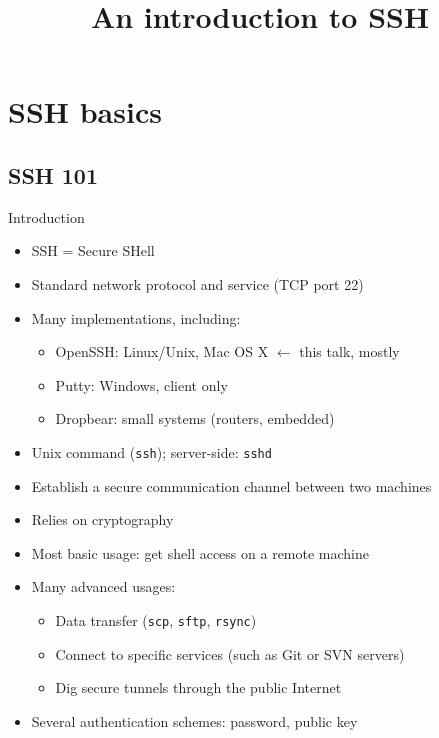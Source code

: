 \documentclass[11pt,final,usepdftitle=false]{beamer}
\title{An introduction to SSH}
\date{}
\begin{document}
\frame{\titlepage}

\section{SSH basics}
\subsection{SSH 101}
\begin{frame}{Introduction}
\begin{itemize}
\item SSH = Secure SHell
\item Standard network protocol and service (TCP port 22)
\item Many implementations, including:
	\begin{itemize}
		\item OpenSSH: Linux/Unix, Mac OS X \alert{$\leftarrow$ this talk, mostly}
		\item Putty: Windows, client only
		\item Dropbear: small systems (routers, embedded)
	\end{itemize}
\item Unix command (\texttt{ssh}); server-side: \texttt{sshd}
\item Establish a \alert{secure communication channel} between two machines
\item Relies on cryptography
\item Most basic usage: \alert{get shell access} on a remote machine
\item Many advanced usages:
	\begin{itemize}
		\item Data transfer (\texttt{scp}, \texttt{sftp}, \texttt{rsync})
		\item Connect to specific services (such as Git or SVN servers)
		\item Dig secure tunnels through the public Internet
	\end{itemize}
\item Several authentication schemes: password, public key
\end{itemize}
\end{frame}
\end{document}
